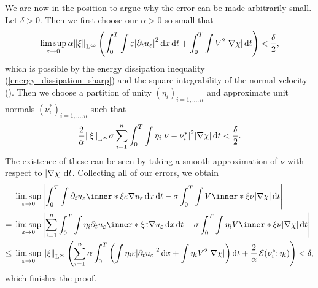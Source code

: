 We are now in the position to argue why the error can be made arbitrarily 
small. 
Let $ \delta > 0 $. Then we first choose our $ \alpha > 0 $ so small that 
\begin{equation*}
	\limsup_{ \varepsilon \to 0 }
	\alpha \norm{ \xi }_{ \operatorname{L}^{ \infty } }
	\left(
	\int_{ 0 }^{ T }
	\int
	\varepsilon 
	\abs{ \partial_{  t } u_{ \varepsilon } }^{ 2 }
	\dd{ x }
	\dd{ t }
	+
	\int_{ 0 }^{ T }
	\int
	V^{ 2 }
	\abs{ \nabla \chi }
	\dd{ t }
	\right)
	<
	\frac{ \delta }{ 2 },
\end{equation*}
which is possible by the energy dissipation inequality 
(\ref{energy_dissipation_sharp}) and the square-integrability of the normal 
velocity ().
Then we choose a partition of unity $ \left( \eta_{ i } \right)_{ i = 1 , 
\dotsc , n } $ and approximate unit normals $ \left( \nu^{ \ast }_{ i 
}\right)_{i = 1 , \dotsc, n } $ such that
\begin{equation*}
	\frac{ 2 }{ \alpha }
	\norm{ \xi }_{ \operatorname{L}^{ \infty } }
	\sigma
	\sum_{ i = 1 }^{ n }
	\int_{ 0 }^{ T }
	\int
	\eta_{ i }
	\abs{ \nu - \nu_{ i }^{ \ast } }^{ 2 }
	\abs{ \nabla \chi }
	\dd{ t }
	<
	\frac{ \delta }{2 }.
\end{equation*}
The existence of these can be seen by taking a smooth approximation of $ \nu $ 
with respect to $ \abs{ \nabla \chi } \dd{ t } $.
Collecting all of our errors, we obtain
\begin{align*}
	& \limsup_{ \varepsilon \to 0 }
	\abs{
		\int_{ 0 }^{ T }
		\int
		\partial_{  t } u_{ \varepsilon }
		\inner*{ \xi }{ \varepsilon \nabla u_{ \varepsilon } }
		\dd{ x }
		\dd{ t }
		-
		\sigma
		\int_{ 0 }^{ T }
		\int
		V \inner*{ \xi }{ \nu }
		\abs{ \nabla \chi }
		\dd{ t }
	}
	\\
	= {} &
	\limsup_{ \varepsilon \to 0 }
	\abs{
		\sum_{ i = 1 }^{ n }
		\int_{ 0 }^{ T }
		\int
		\eta_{ i }
		\partial_{  t } u_{ \varepsilon }
		\inner*{ \xi }{ \varepsilon \nabla u_{ \varepsilon } }
		\dd{ x }
		\dd{ t }
		-
		\sigma
		\int_{ 0 }^{ T }
		\int
		\eta_{ i }
		V \inner*{ \xi }{ \nu }
		\abs{ \nabla \chi }
		\dd{ t }
	}
	\\
	\leq {} & 
	\limsup_{ \varepsilon \to 0 }
	\norm{ \xi }_{ \lp^{ \infty } }
	\left(
	\sum_{ i = 1 }^{ n } 
	\alpha 
	\int_{ 0 }^{ T }
	\left(
	\int
	\eta_{ i }
	\varepsilon
	\abs{ \partial_{  t } u_{ \varepsilon } }^{ 2 }
	\dd{ x }
	+
	\int
	\eta_{ i }
	V^{ 2 }
	\abs{ \nabla \chi }
	\right)
	\dd{ t }
	+
	\frac{ 2 }{ \alpha }
	\tilt_excess ( \nu_{ i }^{ \ast } ; \eta_{ i } )
	\right)
	< \delta,
\end{align*}
which finishes the proof.